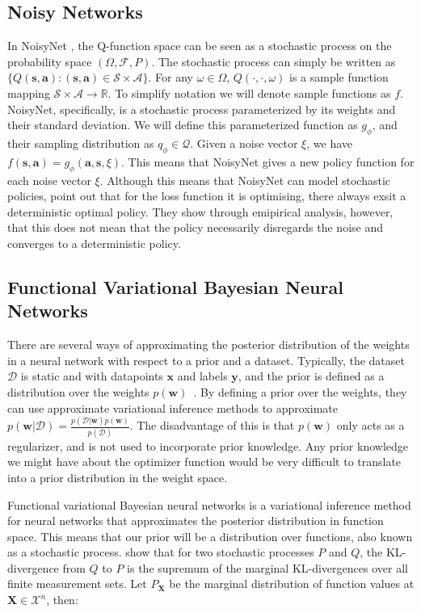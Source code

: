 \documentclass[]{uai2021} %
\newcommand{\D}{\mathcal{D}}
\newcommand{\X}{\mathbf{X}}
\newcommand{\state}{\mathcal{S}}
\newcommand{\action}{\mathcal{A}}
\begin{document}
\subsection{Noisy Networks}
In NoisyNet \citep{fortunato_noisy_2019}, the Q-function space can be seen
as a stochastic process on the probability space \((\Omega, \mathcal{F}, P)\).
The stochastic process can simply be written as
\(\{Q(\bm{s}, \bm{a}) : (\bm{s}, \bm{a}) \in \state \times \action \}\). For
any \(\omega \in \Omega\), \(Q(\cdot, \cdot, \omega)\) is a sample function
mapping \(\state \times \action \rightarrow \mathbb{R}\). To simplify notation
we will denote sample functions as \(f\). NoisyNet, specifically, is a stochastic
process parameterized by its weights and their standard deviation. We will define
this parameterized function as \(g_\phi\), and their sampling distribution as
\(q_\phi \in \mathcal{Q}\). Given a noise vector \(\xi\), we have
\(f(\bm{s}, \bm{a}) = g_\phi(\bm{a}, \bm{s}, \xi)\). This means that NoisyNet
gives a new policy function for each noise vector \(\xi\). Although this means
that NoisyNet can model stochastic policies, \citet{fortunato_noisy_2019} point
out that for the loss function it is optimising, there always exsit a deterministic
optimal policy. They show through emipirical analysis, however, that this does not
mean that the policy necessarily disregards the noise and converges to a deterministic
policy.

\subsection{Functional Variational Bayesian Neural Networks}
There are several ways of approximating the posterior distribution of the weights
in a neural network with respect to a prior and a dataset. Typically, the dataset
\(\D\) is static and with datapoints \(\bm{x}\) and labels \(\bm{y}\), and the 
prior is defined as a distribution over the weights
\(p(\bm{w})\)~\citep{rezende_stochastic_2014,blundell_weight_2015,ritter_scalable_2018,maddox_simple_2019}.
By defining a prior over the weights, they can use approximate variational inference
methods to approximate \(p(\bm{w} \vert \D) = \frac{p(\D \vert \bm{w})p(\bm{w})}{p(\D)}\).
The disadvantage of this is that \(p(\bm{w})\) only acts as a regularizer, and is not
used to incorporate prior knowledge. Any prior knowledge we might have about the optimizer
function would be very difficult to translate into a prior distribution in the weight space.

Functional variational Bayesian neural networks \citep{sun_functional_2019} is 
a variational inference method for neural networks that approximates the 
posterior distribution in function space. This means that our prior will be a distribution
over functions, also known as a stochastic process.
\citet{sun_functional_2019} show that for two stochastic processes \(P\) and \(Q\), the
KL-divergence from \(Q\) to \(P\) is the supremum of the marginal KL-divergences over
all finite measurement sets. Let \(P_\X\) be the marginal distribution of function values
at \(\X \in \mathcal{X}^n\), then:
\end{document}
